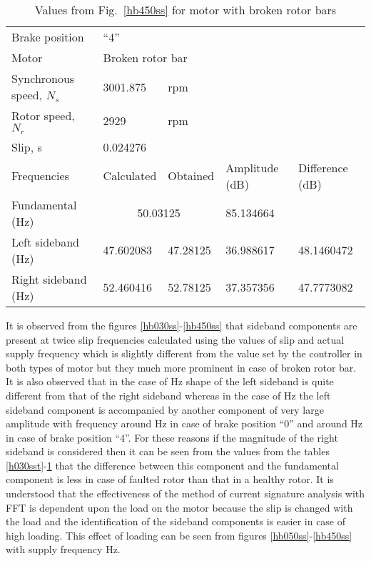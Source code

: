 \documentclass[a4paper,11pt]{report}
\begin{document}
\begin{table}[h]
\centering
\begin{tabular}{lllll}
Brake position	& ``4'' & & & \\			
Motor &	\multicolumn{4}{l}{Broken rotor	bar} \\ 
Synchronous speed, $N_{s}$	& 3001.875 & rpm & & \\			
Rotor speed, $N_{r}$ 	  	& 2929	& rpm& & \\		
Slip, s			  	&  \multicolumn{4}{l}{0.024276} \\			
Frequencies 		  	& Calculated & Obtained & Amplitude (dB) & Difference (dB) \\
Fundamental (Hz)		& \multicolumn{2}{c}{50.03125}	& 85.134664	&  \\ 
Left sideband (Hz) 		& 47.602083 & 47.28125 & 36.988617 & 48.1460472 \\
Right sideband (Hz)		& 52.460416 & 52.78125 & 37.357356 & 47.7773082 
\end{tabular}
\caption{Values from Fig.~\ref{hb450ss} for motor with broken rotor bars} \label{b450sst}
\end{table}

It is observed from the figures \ref{hb030ss}-\ref{hb450ss} that sideband components are present at twice slip frequencies calculated using the values of slip and actual supply frequency which is slightly different from the value set by the controller in both types of motor but they much more prominent in case of broken rotor bar. It is also observed that in the case of \unit[30]{Hz} shape of the left sideband is quite different from that of the right sideband whereas in the case of \unit[50]{Hz} the left sideband component is accompanied by another component of very large amplitude with frequency around \unit[48]{Hz} in case of brake position ``0'' and around \unit[49]{Hz} in case of brake position ``4''. For these reasons if the magnitude of the right sideband is considered then it can be seen from the values from the tables \ref{h030sst}-\ref{b450sst} that the difference between this component and the fundamental component is less in case of faulted rotor than that in a healthy rotor. It is understood that the effectiveness of the method of current signature analysis with FFT is dependent upon the load on the motor because the slip is changed with the load and the identification of the sideband components is easier in case of high loading. This effect of loading can be seen from figures \ref{hb050ss}-\ref{hb450ss} with supply frequency \unit[50]{Hz}.
\end{document}
